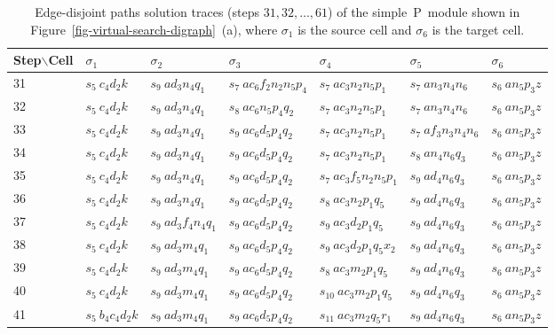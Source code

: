 \documentclass[preliminary,copyright,creativecommons]{eptcs}
\theoremstyle{remark}
\begin{document}
\begin{table}[h]
\caption{Edge-disjoint paths solution traces (steps $31, 32, \ldots, 61$) of the 
simple~P~module shown in Figure~\ref{fig-virtual-search-digraph}~(a),
where $\sigma_1$ is the source cell and $\sigma_6$ is the target cell.}
\label{tab-trace1}
\begin{center}
\renewcommand{\tabcolsep}{3.0pt}
\renewcommand{\arraystretch}{1.3}
\footnotesize
\noindent
\begin{tabular}{ | l | l | l | l | l | l | l | }
\hline
Step$\backslash$Cell
 & $\sigma_1$ & $\sigma_2$ & $\sigma_3$ & $\sigma_4$ & $\sigma_5$ & $\sigma_6$ \\ \hline
31 & $s_5~ c_4d_2k$ & $s_9~ ad_3n_4q_1$ & $s_7~ ac_6f_2n_2n_5p_4$ & $s_7~ ac_3n_2n_5p_1$ & $s_7~ an_3n_4n_6$ & $s_6~ an_5p_3z$ \\ \hline
32 & $s_5~ c_4d_2k$ & $s_9~ ad_3n_4q_1$ & $s_8~ ac_6n_5p_4q_2$ & $s_7~ ac_3n_2n_5p_1$ & $s_7~ an_3n_4n_6$ & $s_6~ an_5p_3z$ \\ \hline
33 & $s_5~ c_4d_2k$ & $s_9~ ad_3n_4q_1$ & $s_9~ ac_6d_5p_4q_2$ & $s_7~ ac_3n_2n_5p_1$ & $s_7~ af_3n_3n_4n_6$ & $s_6~ an_5p_3z$ \\ \hline
34 & $s_5~ c_4d_2k$ & $s_9~ ad_3n_4q_1$ & $s_9~ ac_6d_5p_4q_2$ & $s_7~ ac_3n_2n_5p_1$ & $s_8~ an_4n_6q_3$ & $s_6~ an_5p_3z$ \\ \hline
35 & $s_5~ c_4d_2k$ & $s_9~ ad_3n_4q_1$ & $s_9~ ac_6d_5p_4q_2$ & $s_7~ ac_3f_5n_2n_5p_1$ & $s_9~ ad_4n_6q_3$ & $s_6~ an_5p_3z$ \\ \hline
36 & $s_5~ c_4d_2k$ & $s_9~ ad_3n_4q_1$ & $s_9~ ac_6d_5p_4q_2$ & $s_8~ ac_3n_2p_1q_5$ & $s_9~ ad_4n_6q_3$ & $s_6~ an_5p_3z$ \\ \hline
37 & $s_5~ c_4d_2k$ & $s_9~ ad_3f_4n_4q_1$ & $s_9~ ac_6d_5p_4q_2$ & $s_9~ ac_3d_2p_1q_5$ & $s_9~ ad_4n_6q_3$ & $s_6~ an_5p_3z$ \\ \hline
38 & $s_5~ c_4d_2k$ & $s_9~ ad_3m_4q_1$ & $s_9~ ac_6d_5p_4q_2$ & $s_9~ ac_3d_2p_1q_5x_2$ & $s_9~ ad_4n_6q_3$ & $s_6~ an_5p_3z$ \\ \hline
39 & $s_5~ c_4d_2k$ & $s_9~ ad_3m_4q_1$ & $s_9~ ac_6d_5p_4q_2$ & $s_8~ ac_3m_2p_1q_5$ & $s_9~ ad_4n_6q_3$ & $s_6~ an_5p_3z$ \\ \hline
40 & $s_5~ c_4d_2k$ & $s_9~ ad_3m_4q_1$ & $s_9~ ac_6d_5p_4q_2$ & $s_{10}~ ac_3m_2p_1q_5$ & $s_9~ ad_4n_6q_3$ & $s_6~ an_5p_3z$ \\ \hline
41 & $s_5~ b_4c_4d_2k$ & $s_9~ ad_3m_4q_1$ & $s_9~ ac_6d_5p_4q_2$ & $s_{11}~ ac_3m_2q_5r_1$ & $s_9~ ad_4n_6q_3$ & $s_6~ an_5p_3z$ \\ \hline

\end{tabular}
\end{center}
\end{table}
\end{document}
